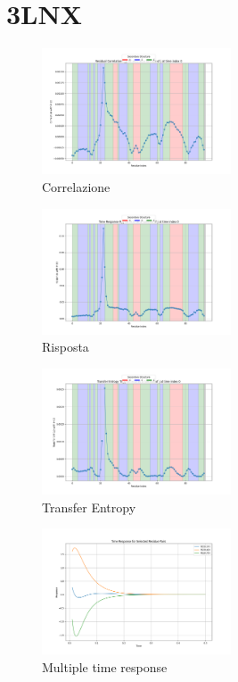 \documentclass{article}
\begin{document}
\section{3LNX}
\begin{figure}[H]
    \centering
    \includegraphics[width=0.5\textwidth]{"images/3LNXResidual Correlation C_ij for i=22 as a function of j at time index 0.png"}
    \caption{Correlazione}
\end{figure}
\begin{figure}[H]
    \centering
    \includegraphics[width=0.5\textwidth]{"images/3LNXTime Response R_ij for i=22 as a function of j at time index 0.png"}
    \caption{Risposta}
\end{figure}

\begin{figure}[H]
    \centering
    \includegraphics[width=0.5\textwidth]{"images/3LNXTransfer Entropy TE_ij for i=22 as a function of j at time index 0.png"}
    \caption{Transfer Entropy}
\end{figure}
\begin{figure}[H]
    \centering
    \includegraphics[width=0.5\textwidth]{"images/3LNXMultiple_time_resposne.png"}
    \caption{Multiple time response}
\end{figure}
\end{document}
